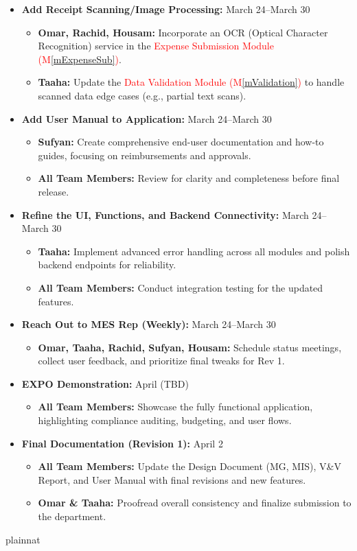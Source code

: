 \documentclass[12pt, titlepage]{article}
\newcommand{\mref}[1]{M\ref{#1}}
\begin{document}
\begin{itemize}
  \item \textbf{Add Receipt Scanning/Image Processing:} March 24--March 30
  \begin{itemize}
    \item \textbf{Omar, Rachid, Housam:} Incorporate an OCR (Optical Character Recognition) service in the \textcolor{red}{Expense Submission Module (\mref{mExpenseSub})}.
    \item \textbf{Taaha:} Update the \textcolor{red}{Data Validation Module (\mref{mValidation})} to handle scanned data edge cases (e.g., partial text scans).
  \end{itemize}

  \item \textbf{Add User Manual to Application:} March 24--March 30
  \begin{itemize}
    \item \textbf{Sufyan:} Create comprehensive end-user documentation and how-to guides, focusing on reimbursements and approvals.
    \item \textbf{All Team Members:} Review for clarity and completeness before final release.
  \end{itemize}

  \item \textbf{Refine the UI, Functions, and Backend Connectivity:} March 24--March 30
  \begin{itemize}
    \item \textbf{Taaha:} Implement advanced error handling across all modules and polish backend endpoints for reliability.
    \item \textbf{All Team Members:} Conduct integration testing for the updated features.
  \end{itemize}

  \item \textbf{Reach Out to MES Rep (Weekly):} March 24--March 30
  \begin{itemize}
    \item \textbf{Omar, Taaha, Rachid, Sufyan, Housam:} Schedule status meetings, collect user feedback, and prioritize final tweaks for Rev 1.
  \end{itemize}

  \item \textbf{EXPO Demonstration:} April (TBD)
  \begin{itemize}
    \item \textbf{All Team Members:} Showcase the fully functional application, highlighting compliance auditing, budgeting, and user flows.
  \end{itemize}

  \item \textbf{Final Documentation (Revision 1):} April 2
  \begin{itemize}
    \item \textbf{All Team Members:} Update the Design Document (MG, MIS), V\&V Report, and User Manual with final revisions and new features.
    \item \textbf{Omar \& Taaha:} Proofread overall consistency and finalize submission to the department.
  \end{itemize}
\end{itemize}


 {plainnat}


\newpage{}
\end{document}
